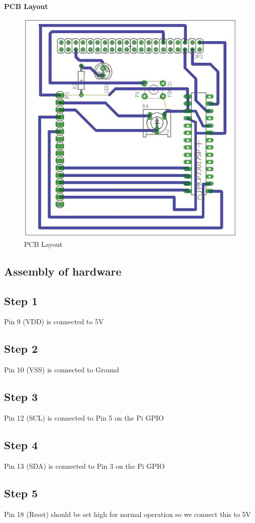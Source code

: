 \documentclass[a4paper,12pt,oneside]{book}
\begin{document}
\textbf{PCB Layout}\\
\begin{figure}[H]
    \centering
    \includegraphics[scale= 0.4]{lcd_pcb_layout}
    \caption{PCB Layout}
\end{figure}
\subsection*{Assembly of hardware}
\subsection*{Step 1}
Pin 9 (VDD) is connected to 5V
\subsection*{Step 2}
Pin 10 (VSS) is connected to Ground
\subsection*{Step 3}
Pin 12 (SCL) is connected to Pin 5 on the Pi GPIO
\subsection*{Step 4}
Pin 13 (SDA) is connected to Pin 3 on the Pi GPIO
\subsection*{Step 5}
Pin 18 (Reset) should be set high for normal operation so we connect this to 5V
\end{document}
